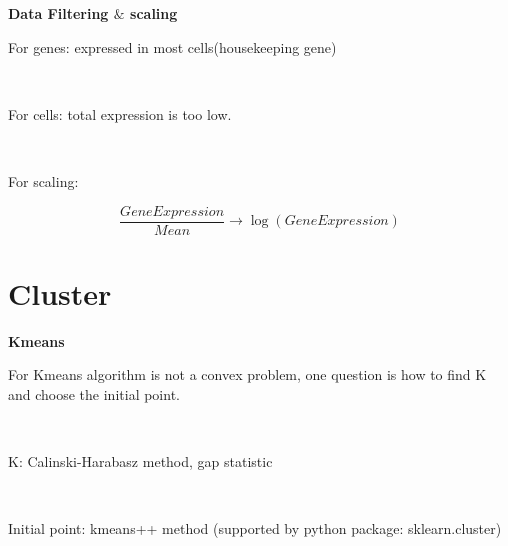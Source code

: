 \documentclass[12pt]{beamer}
\begin{document}
\begin{frame}{\textbf{Data Filtering \(\&\) scaling}}

For genes:
expressed in most cells(housekeeping gene)

\
\

For cells:
total expression is too low.

\
\

For scaling:

\[\frac{Gene Expression}{Mean}\rightarrow \log(Gene Expression) \]

\end{frame}






\section{Cluster}

\begin{frame}{\textbf{Kmeans}}

For Kmeans algorithm is not a convex problem, one question is how to find K and choose the initial point.

\
\

K: Calinski-Harabasz method, gap statistic

\
\

Initial point: kmeans++ method (supported by python package: sklearn.cluster)

\
\

\end{frame}
\end{document}
